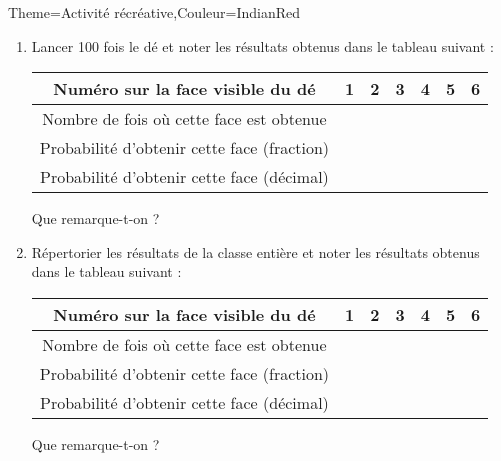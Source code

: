 \begin{Maquette}[Cours]{Theme={Activité récréative},Couleur={IndianRed}}
{\begin{enumerate}
         \item Lancer 100 fois le dé et noter les résultats obtenus dans le tableau suivant : \par \smallskip
            \begin{tabular}{|c|*{6}{C{1}|}}
               \hline
               Numéro sur la face visible du dé & 1 & 2 & 3 & 4 & 5 & 6 \\
               \hline
               Nombre de fois où cette face est obtenue & & & & & & \\
               \hline
               Probabilité d'obtenir cette face (fraction) & & & & & & \\
               \hline
               Probabilité d'obtenir cette face (décimal) & & & & & & \\
               \hline
            \end{tabular} \par \bigskip
            Que remarque-t-on ? \pointilles
         
         \vfill

         \item Répertorier les résultats de la classe entière et noter les résultats obtenus dans le tableau suivant : \\ [1mm]
            \begin{tabular}{|c|*{6}{C{1}|}}
               \hline
               Numéro sur la face visible du dé & 1 & 2 & 3 & 4 & 5 & 6 \\
               \hline
               Nombre de fois où cette face est obtenue & & & & & & \\
               \hline
               Probabilité d'obtenir cette face (fraction) & & & & & & \\
               \hline
               Probabilité d'obtenir cette face (décimal) & & & & & & \\
               \hline
            \end{tabular} \par \bigskip
            Que remarque-t-on ? \pointilles
      \end{enumerate}}

   
\end{Maquette}